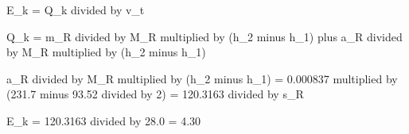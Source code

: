 E_k = Q_k divided by v_t  

Q_k = m_R divided by M_R multiplied by (h_2 minus h_1) plus a_R divided by M_R multiplied by (h_2 minus h_1)  

a_R divided by M_R multiplied by (h_2 minus h_1) = 0.000837 multiplied by (231.7 minus 93.52 divided by 2) = 120.3163 divided by s_R  

E_k = 120.3163 divided by 28.0 = 4.30